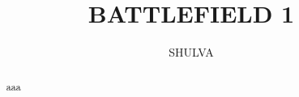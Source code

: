 \documentclass[]{article}
\title{BATTLEFIELD 1}
\author{SHULVA }
\begin{document}
\maketitle

\begin{abstract}
aaa
\end{abstract}

\section{}
\end{document}
